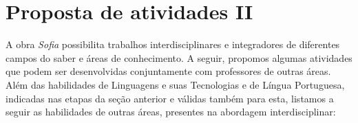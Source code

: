 \documentclass{extarticle}
\begin{document}
\section{Proposta de atividades II}

A obra \emph{Sofia} possibilita trabalhos interdisciplinares e
integradores de diferentes campos do saber e áreas de conhecimento. A
seguir, propomos algumas atividades que podem ser desenvolvidas
conjuntamente com professores de outras áreas. Além das habilidades de
Linguagens e suas Tecnologias e de Língua Portuguesa, indicadas nas
etapas da seção anterior e válidas também para esta, listamos a seguir
as habilidades de outras áreas, presentes na abordagem interdisciplinar:







\end{document}
